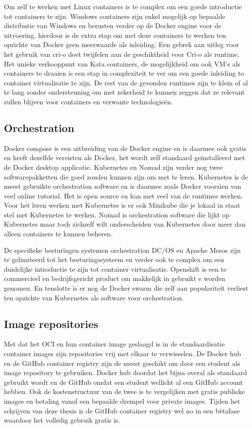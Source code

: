 \begin{itemize}
Om zelf te werken met Linux containers is te complex om een goede introductie tot containers te zijn. Windows containers zijn enkel mogelijk op bepaalde distributie van Windows en berusten verder op de Docker engine voor de uitvoering, hierdoor is de extra stap om met deze containers te werken ten opzichte van Docker geen meerwaarde als inleiding. Een gebrek aan uitleg voor het gebruik van cri-o doet twijfelen aan de geschiktheid voor Cri-o als runtime.  Het unieke verkooppunt van Kata containers, de mogelijkheid om ook VM’s als containers te draaien is een stap in complexiteit te ver om een goede inleiding to container virtualisatie te zijn.  De rest van de gevonden runtimes zijn te klein of al te lang zonder ondersteuning om met zekerheid te kunnen zeggen dat ze relevant zullen blijven voor containers en verwante technologieën.

\subsection{Orchestration}
Docker compose is een uitbreiding van de Docker engine en is daarmee ook gratis en heeft dezelfde vereisten als Docker, het wordt zelf standaard geïnstalleerd met de Docker desktop applicatie. Kubernetes en Nomad zijn verder nog twee softwarepakketten die goed zouden kunnen zijn om met te leren. Kubernetes is de meest gebruikte orchestration software en is daarmee zoals Docker voorzien van veel online tutorial. Het is open source en kan met veel van de runtimes werken. Voor het leren werken met Kubernetes is er ook Minikube die je lokaal in staat stel met Kubernetes te werken. Nomad is orchestration software die lijkt op Kubernetes maar toch zichzelf wilt onderscheiden van Kubernetes door meer dan alleen containers te kunnen beheren. 

De specifieke besturingen systemen orchestration DC/OS en Apache Mesos zijn te gelimiteerd tot het besturingssysteem en verder ook te complex om een duidelijke introductie te zijn tot container virtualisatie.  Openshift is een te commercieel en bedrijfsgericht product om makkelijk in gebruikt e worden genomen. En tenslotte is er nog de Docker swarm die zelf aan populariteit verliest ten opzichte van Kubernetes als software voor orchestration.


\subsection{Image repositories}
Met dat het OCI en hun container image geslaagd is in de standaardisatie container images zijn repositories vrij met elkaar te verwisselen. De Docker hub en de GitHub container registry zijn de meest geschikt om door een student als image repository te gebruiken.  Docker hub doordat het bijna overal als standaard gebruikt wordt en de GitHub omdat een student wellicht al een GitHub account hebben. Ook de kostenstructuur van de twee is te vergelijken met gratis publieke images en betaling vanaf een bepaalde drempel voor private images. Tijden het schrijven van deze thesis is de GitHub container registry wel no in een bètafase waardoor het volledig gebruik gratis is.


\end{itemize}
